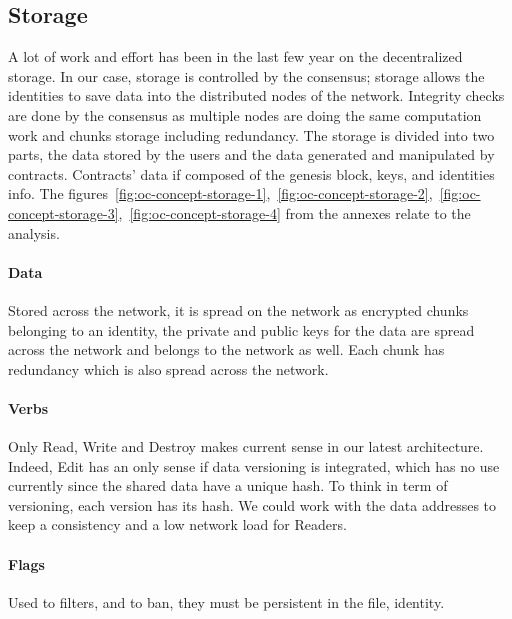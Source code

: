
\subsection{Storage} A lot of work and effort has been in the last few year on the decentralized storage. In our case, storage is controlled by the consensus; storage allows the identities to save data into the distributed nodes of the network. Integrity checks are done by the consensus as multiple nodes are doing the same computation work and chunks storage including redundancy. The storage is divided into two parts, the data stored by the users and the data generated and manipulated by contracts. Contracts' data if composed of the genesis block, keys, and identities info. The figures~\ref{fig:oc-concept-storage-1},~\ref{fig:oc-concept-storage-2},~\ref{fig:oc-concept-storage-3},~\ref{fig:oc-concept-storage-4} from the annexes relate to the analysis.

\paragraph{Data} Stored across the network, it is spread on the network as encrypted chunks belonging to an identity, the private and public keys for the data are spread across the network and belongs to the network as well. Each chunk has redundancy which is also spread across the network.

\paragraph{Verbs} Only Read, Write and Destroy makes current sense in our latest architecture. Indeed, Edit has an only sense if data versioning is integrated, which has no use currently since the shared data have a unique hash. To think in term of versioning, each version has its hash. We could work with the data addresses to keep a consistency and a low network load for Readers.

\paragraph{Flags} Used to filters, and to ban, they must be persistent in the file, identity.

